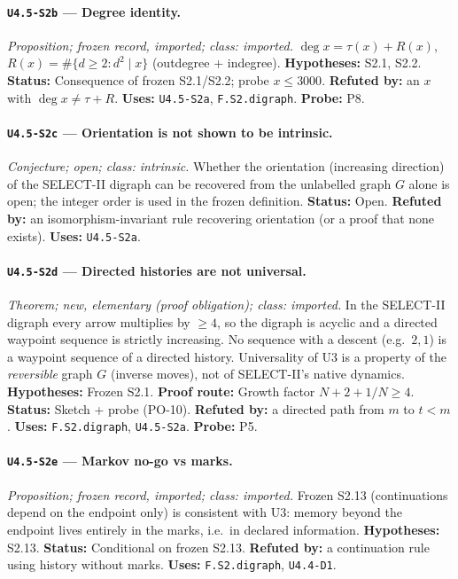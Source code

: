 \documentclass[11pt]{article}
\begin{document}
\paragraph{\texttt{U4.5-S2b} --- Degree identity.} \emph{Proposition; frozen record, imported; class: imported.} $\deg x=\tau(x)+R(x)$, $R(x)=\#\{d\ge2:d^2\mid x\}$ (outdegree + indegree). \textbf{Hypotheses:} S2.1, S2.2. \textbf{Status:} Consequence of frozen S2.1/S2.2; probe $x\le3000$. \textbf{Refuted by:} an $x$ with $\deg x\ne\tau+R$. \textbf{Uses:} \texttt{U4.5-S2a}, \texttt{F.S2.digraph}. \textbf{Probe:} P8.

\paragraph{\texttt{U4.5-S2c} --- Orientation is not shown to be intrinsic.} \emph{Conjecture; open; class: intrinsic.} Whether the orientation (increasing direction) of the SELECT-II digraph can be recovered from the unlabelled graph $G$ alone is open; the integer order is used in the frozen definition. \textbf{Status:} Open. \textbf{Refuted by:} an isomorphism-invariant rule recovering orientation (or a proof that none exists). \textbf{Uses:} \texttt{U4.5-S2a}.

\paragraph{\texttt{U4.5-S2d} --- Directed histories are not universal.} \emph{Theorem; new, elementary (proof obligation); class: imported.} In the SELECT-II digraph every arrow multiplies by $\ge4$, so the digraph is acyclic and a directed waypoint sequence is strictly increasing. No sequence with a descent (e.g.\ $2,1$) is a waypoint sequence of a directed history. Universality of U3 is a property of the \emph{reversible} graph $G$ (inverse moves), not of SELECT-II's native dynamics. \textbf{Hypotheses:} Frozen S2.1. \textbf{Proof route:} Growth factor $N+2+1/N\ge4$. \textbf{Status:} Sketch + probe (PO-10). \textbf{Refuted by:} a directed path from $m$ to $t<m$. \textbf{Uses:} \texttt{F.S2.digraph}, \texttt{U4.5-S2a}. \textbf{Probe:} P5.

\paragraph{\texttt{U4.5-S2e} --- Markov no-go vs marks.} \emph{Proposition; frozen record, imported; class: imported.} Frozen S2.13 (continuations depend on the endpoint only) is consistent with U3: memory beyond the endpoint lives entirely in the marks, i.e.\ in declared information. \textbf{Hypotheses:} S2.13. \textbf{Status:} Conditional on frozen S2.13. \textbf{Refuted by:} a continuation rule using history without marks. \textbf{Uses:} \texttt{F.S2.digraph}, \texttt{U4.4-D1}.
\end{document}
